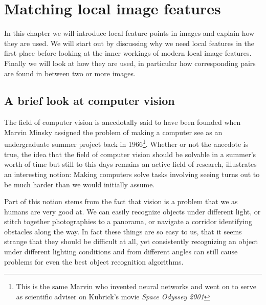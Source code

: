 \chapter{Matching local image features}

In this chapter we will introduce local feature points in images and 
explain how they are used. We will start out by discussing why we need 
local features in the first place before looking at the inner workings 
of modern local image features. Finally we will look at how they are 
used, in particular how corresponding pairs are found in between two or 
more images.

\section{A brief look at computer vision}

The field of computer vision is anecdotally said to have been founded 
when Marvin Minsky assigned the problem of making a computer see as an 
undergraduate summer project back in 1966\footnote{This is the same 
Marvin who invented neural networks and went on to serve as scientific 
adviser on Kubrick's movie \emph{Space Odyssey 2001}}. Whether or not 
the anecdote is true, the idea that the field of computer vision should 
be solvable in a summer's worth of time but still to this days remains 
an active field of research, illustrates an interesting notion: Making 
computers solve tasks involving seeing turns out to be much harder than 
we would initially assume.

Part of this notion stems from the fact that vision is a problem that we 
as humans are very good at. We can easily recognize objects under 
different light, or stitch together photographies to a panorama, or 
navigate a corridor identifying obstacles along the way. In fact these 
things are so easy to us, that it seems strange that they should be 
difficult at all, yet consistently recognizing an object under different 
lighting conditions and from different angles can still cause problems 
for even the best object recognition algorithms.

